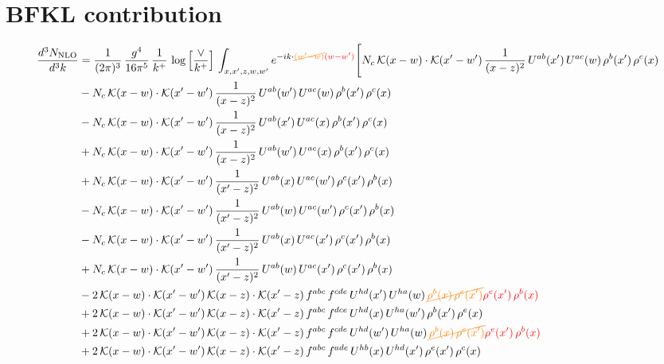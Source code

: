 \documentclass[9pt]{article}
\numberwithin{equation}{section}
\begin{document}
\section{BFKL contribution}
\begin{align}
    \frac{d^{3}N_{\mathrm{NLO}}}{d^{3}k} & = \frac{1}{(2\pi)^{3}}\,\frac{g^{4}}{16\pi^{5}}\,\frac{1}{k^{+}}\,\log\Big[\frac{\vee}{k^{+}}\Big]\,\int_{x,x',z,w,w'}e^{-ik\cdot{\color{orange}\cancel{(w'-w)}}{\color{red}(w-w')}}\Bigg[N_{c}\,\mathcal{K}(x-w)\cdot\mathcal{K}(x'-w')\,\frac{1}{(x-z)^{2}}\,U^{ab}(x')\,U^{ac}(w)\,\rho^{b}(x')\,\rho^{c}(x)\notag\\
&-N_{c}\,\mathcal{K}(x-w)\cdot\mathcal{K}(x'-w')\,\frac{1}{(x-z)^{2}}\,U^{ab}(w')\,U^{ac}(w)\,\rho^{b}(x')\,\rho^{c}(x)\notag\\
&-N_{c}\,\mathcal{K}(x-w)\cdot\mathcal{K}(x'-w')\,\frac{1}{(x-z)^{2}}\,U^{ab}(x')\,U^{ac}(x)\,\rho^{b}(x')\,\rho^{c}(x)\notag\\
&+N_{c}\,\mathcal{K}(x-w)\cdot\mathcal{K}(x'-w')\,\frac{1}{(x-z)^{2}}\,U^{ab}(w')\,U^{ac}(x)\,\rho^{b}(x')\,\rho^{c}(x)\notag\\
&+N_{c}\,\mathcal{K}(x-w)\cdot\mathcal{K}(x'-w')\,\frac{1}{(x'-z)^{2}}\,U^{ab}(x)\,U^{ac}(w')\,\rho^{c}(x')\,\rho^{b}(x)\notag\\
&-N_{c}\,\mathcal{K}(x-w)\cdot\mathcal{K}(x'-w')\,\frac{1}{(x'-z)^{2}}\,U^{ab}(w)\,U^{ac}(w')\,\rho^{c}(x')\,\rho^{b}(x)\notag\\
&-N_{c}\,\mathcal{K}(x-w)\cdot\mathcal{K}(x'-w')\,\frac{1}{(x'-z)^{2}}\,U^{ab}(x)\,U^{ac}(x')\,\rho^{c}(x')\,\rho^{b}(x)\notag\\
&+N_{c}\,\mathcal{K}(x-w)\cdot\mathcal{K}(x'-w')\,\frac{1}{(x'-z)^{2}}\,U^{ab}(w)\,U^{ac}(x')\,\rho^{c}(x')\,\rho^{b}(x)\notag\\
&-2\,\mathcal{K}(x-w)\cdot\mathcal{K}(x'-w')\,\mathcal{K}(x-z)\cdot\mathcal{K}(x'-z)\,f^{abc}\,f^{cde}\,U^{hd}(x')\,U^{ha}(w)\,{\color{orange}\cancel{\rho^{b}(x)\,\rho^{e}(x')}}{\color{red}\rho^{e}(x')\,\rho^{b}(x)}\notag\\
&+2\,\mathcal{K}(x-w)\cdot\mathcal{K}(x'-w')\,\mathcal{K}(x-z)\cdot\mathcal{K}(x'-z)\,f^{abc}\,f^{dce}\,U^{hd}(x)\,U^{ha}(w')\,\rho^{b}(x')\,\rho^{e}(x)\notag\\
&+2\,\mathcal{K}(x-w)\cdot\mathcal{K}(x'-w')\,\mathcal{K}(x-z)\cdot\mathcal{K}(x'-z)\,f^{abc}\,f^{cde}\,U^{hd}(w')\,U^{ha}(w)\,{\color{orange}\cancel{\rho^{b}(x)\,\rho^{e}(x')}}{\color{red}\rho^{e}(x')\,\rho^{b}(x)}\notag\\
&+2\,\mathcal{K}(x-w)\cdot\mathcal{K}(x'-w')\,\mathcal{K}(x-z)\cdot\mathcal{K}(x'-z)\,f^{abc}\,f^{ade}\,U^{hb}(x)\,U^{hd}(x')\,\rho^{e}(x')\,\rho^{c}(x)\notag\\

\end{align}
\end{document}
